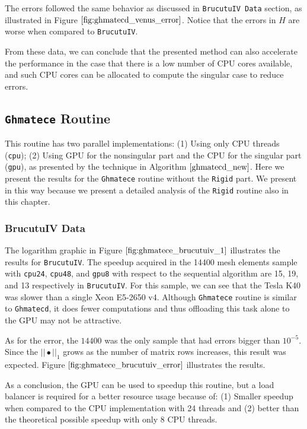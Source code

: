 The errors followed the same behavior as discussed in \texttt{BrucutuIV Data} section, as illustrated in 
Figure $\ref{fig:ghmatecd_venus_error}$. Notice that the errors in $H$ are worse when compared to
\texttt{BrucutuIV}.

From these data, we can conclude that the presented method can also accelerate the performance in 
the case that there is a low number of CPU cores available, and such CPU cores can be allocated to 
compute the singular case to reduce errors. 

\subsection{\texttt{Ghmatece} Routine}

This routine has two parallel implementations: (1) Using only CPU threads (\texttt{cpu}); 
(2) Using GPU for the nonsingular part and the CPU for the singular part (\texttt{gpu}), 
as presented by the technique in Algorithm $\ref{ghmatecd_new}$. Here we present the results 
for the \texttt{Ghmatece} routine without the \texttt{Rigid} part. We present in this way because we present 
a detailed analysis of the \texttt{Rigid} routine also in this chapter.

\subsubsection{BrucutuIV Data}

The logarithm graphic in Figure $\ref{fig:ghmatece_brucutuiv_1}$ illustrates the results 
for \texttt{BrucutuIV}. The speedup acquired in the 14400 mesh elements sample with 
\texttt{cpu24}, \texttt{cpu48}, and \texttt{gpu8} with respect to the sequential algorithm 
are 15, 19, and 13 respectively in \texttt{BrucutuIV}. For this sample, we can see that 
the Tesla K40 was slower than a single Xeon E5-2650 v4. Although \texttt{Ghmatece} 
routine is similar to \texttt{Ghmatecd}, it does fewer computations and thus offloading 
this task alone to the GPU may not be attractive.

As for the error, the $14400$ was the only sample that had errors bigger than $10^{-5}$. Since the $||\bullet||_1$
grows as the number of matrix rows increases, this result was expected. Figure $\ref{fig:ghmatece_brucutuiv_error}$
illustrates the results.

As a conclusion, the GPU can be used to speedup this routine, but a load balancer is required for a 
better resource usage because of: (1) Smaller speedup when compared to the CPU implementation with 
24 threads and (2) better than the theoretical possible speedup with only 8 CPU threads. 

